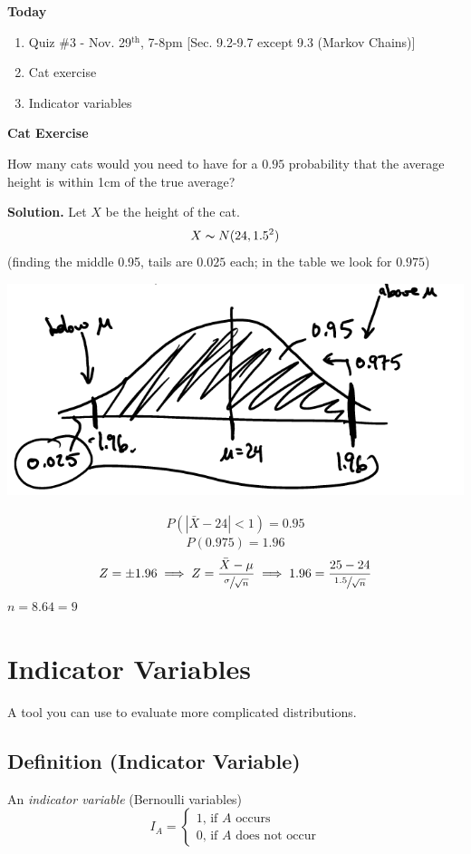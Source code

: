 \textbf{Today}
\begin{enumerate}
    \item Quiz \#3 - Nov. 29$^\text{th}$, 7-8pm [Sec. 9.2-9.7 except 9.3 (Markov Chains)]
    \item Cat exercise
    \item Indicator variables
\end{enumerate}
\textbf{Cat Exercise}

How many cats would you need to have for a $ 0.95 $ probability
that the average height is within 1cm of the true average?

\textbf{Solution.}
Let $ X $ be the height of the cat.
\[ X \thicksim N(24,1.5^2) \]
(finding the middle 0.95, tails are $ 0.025 $ each; in the table we look
for $ 0.975 $)

\begin{center}
    \includegraphics{catscurve.png}
\end{center}
\begin{align*}
    P\left(\left|\bar{X}-24\right|<1\right)=0.95
\end{align*}
\[ P(0.975)=1.96 \]
\[ Z=\pm 1.96\implies Z=\frac{\bar{X}-\mu}{\sfrac{\sigma}{\sqrt{n}}}
    \implies 1.96=\frac{25-24}{\sfrac{1.5}{\sqrt{n}}} \]
$ n=8.64=9 $

\section{Indicator Variables}
A tool you can use to evaluate more complicated distributions.

\begin{defbox}
    \subsection{Definition (Indicator Variable)}
    An \emph{indicator variable} (Bernoulli variables)
    \[ I_A=
        \begin{cases}
            1,\,\text{if $A$ occurs} \\
            0,\,\text{if $A$ does not occur}
        \end{cases} \]
\end{defbox}

